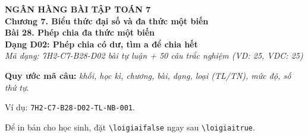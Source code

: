 \documentclass[12pt,a4paper]{article}
\newif\ifloigiai
\begin{document}
\begin{center}
{\Large\textbf{NGÂN HÀNG BÀI TẬP TOÁN 7}}\\[3pt]
\textbf{Chương 7. Biểu thức đại số và đa thức một biến}\\[2pt]
\textbf{Bài 28. Phép chia đa thức một biến}\\[2pt]
\textbf{Dạng D02: Phép chia có dư, tìm a để chia hết}\\[2pt]
\textit{Mã dạng: 7H2-C7-B28-D02  bài tự luận + 50 câu trắc nghiệm \quad (VD: 25, VDC: 25)}
\end{center}
\textbf{Quy ước mã câu:} \textit{khối, học kì, chương, bài, dạng, loại (TL/TN), mức độ, số thứ tự}.\par Ví dụ: \texttt{7H2-C7-B28-D02-TL-NB-001}.\par Để in bản cho học sinh, đặt \verb|\loigiaifalse| ngay sau \verb|\loigiaitrue|.
\end{document}
